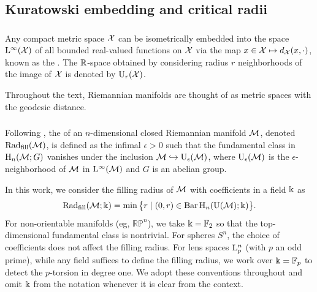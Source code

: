 
\subsection{Kuratowski embedding and critical radii}\label{sub:filling radii}

\subsubsection{}

Any compact metric space \(\mathcal{X}\) can be isometrically embedded into the space \(\mathrm{L}^\infty(\mathcal{X})\) of all bounded real-valued functions on \(\mathcal{X}\) via the map \(x \in \mathcal{X} \mapsto d_{\mathcal{X}}(x,\cdot)\), known as the .
The \(\mathbb{R}\)-space obtained by considering radius \(r\) neighborhoods of the image of \(\mathcal{X}\) is denoted by \(\mathrm{U}_r(\mathcal{X})\).

Throughout the text, Riemannian manifolds are thought of as metric spaces with the geodesic distance.

\subsubsection{}\label{ss:filling_radii_def}

Following \cite{gromov1983filling}, the  of an \(n\)-dimensional closed Riemannian manifold \(\mathcal{M}\), denoted \(\mathrm{Rad}_{\mathrm{fill}}(\mathcal{M})\), is defined as the infimal \(\epsilon > 0\) such that the fundamental class in \(\mathrm{H}_n(\mathcal{M}; G)\) vanishes under the inclusion \(\mathcal{M} \hookrightarrow \mathrm{U}_\epsilon(\mathcal{M})\), where \(\mathrm{U}_\epsilon(\mathcal{M})\) is the \(\epsilon\)-neighborhood of \(\mathcal{M}\) in \(\mathrm{L}^\infty(\mathcal{M})\) and $G$ is an abelian group.

In this work, we consider the filling radius of \(\mathcal{M}\) with coefficients in a field \(\Bbbk\) as
\[
\mathrm{Rad}_{\mathrm{fill}}(\mathcal{M};\Bbbk)
=
\min \big\{ r \mid (0,r) \in \operatorname{Bar} \mathrm{H}_n(\mathrm{U}(\mathcal{M});\Bbbk) \big\}.
\]
For non-orientable manifolds (eg, \(\mathbb{RP}^n\)), we take \(\Bbbk = {\mathbb{F}_2}\) so that the top-dimensional fundamental class is nontrivial.
For spheres $S^n$, the choice of coefficients does not affect the filling radius.
For lens spaces $\mathrm{L}_p^n$ (with $p$ an odd prime), while any field suffices to define the filling radius, we work over $\Bbbk = {\mathbb{F}_p}$ to detect the $p$-torsion in degree one.
We adopt these conventions throughout and omit $\Bbbk$ from the notation whenever it is clear from the context.

\subsubsection{}\label{ss:first_critical_value}

